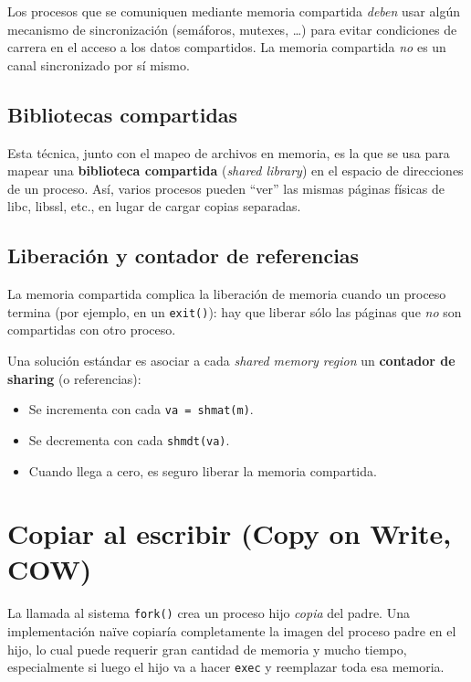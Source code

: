 \documentclass[11pt,a4paper]{article}
\begin{document}
\begin{importante}
Los procesos que se comuniquen mediante memoria compartida \emph{deben}
usar algún mecanismo de sincronización (semáforos, mutexes, \ldots) para
evitar condiciones de carrera en el acceso a los datos compartidos. La
memoria compartida \emph{no} es un canal sincronizado por sí mismo.
\end{importante}

\subsection{Bibliotecas compartidas}

Esta técnica, junto con el mapeo de archivos en memoria, es la que se
usa para mapear una \textbf{biblioteca compartida} (\emph{shared
library}) en el espacio de direcciones de un proceso. Así, varios
procesos pueden ``ver'' las mismas páginas físicas de libc, libssl,
etc., en lugar de cargar copias separadas.

\subsection{Liberación y contador de referencias}

La memoria compartida complica la liberación de memoria cuando un
proceso termina (por ejemplo, en un \texttt{exit()}): hay que liberar
sólo las páginas que \emph{no} son compartidas con otro proceso.

Una solución estándar es asociar a cada \emph{shared memory region} un
\textbf{contador de sharing} (o referencias):

\begin{itemize}[leftmargin=*,nosep]
    \item Se incrementa con cada \verb|va = shmat(m)|.
    \item Se decrementa con cada \verb|shmdt(va)|.
    \item Cuando llega a cero, es seguro liberar la memoria compartida.
\end{itemize}

\section{Copiar al escribir (Copy on Write, COW)}

La llamada al sistema \texttt{fork()} crea un proceso hijo \emph{copia}
del padre. Una implementación naïve copiaría completamente la imagen
del proceso padre en el hijo, lo cual puede requerir gran cantidad de
memoria y mucho tiempo, especialmente si luego el hijo va a hacer
\texttt{exec} y reemplazar toda esa memoria.
\end{document}
